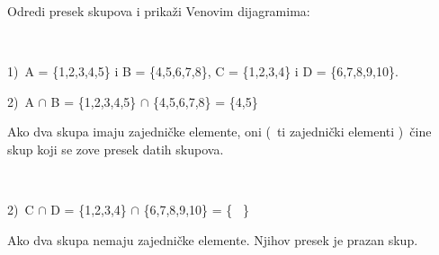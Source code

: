     \begin{zad}

    Odredi presek skupova i prika\v zi Venovim dijagramima: 

    \ 

    

    1)\ A = \{1,2,3,4,5\} i B = \{4,5,6,7,8\}, C = \{1,2,3,4\} i D = \{6,7,8,9,10\}.

    



    2)\ A $\cap$ B = \{1,2,3,4,5\} $\cap$ \{4,5,6,7,8\} = \{4,5\}



    

    \begin{figure}[h] 

        \center


        \caption{}

    \end{figure}



    Ako dva skupa imaju zajedni\v cke elemente, oni (\ ti zajedni\v cki elementi )\ \v cine skup koji se zove presek datih skupova.

    \

    \newpage

    2)\ C $\cap$ D = \{1,2,3,4\} $\cap$ \{6,7,8,9,10\} = \{ \ \}

    

    \begin{figure}[h] 

        \center


        \caption{}

    \end{figure}

    

    Ako dva skupa nemaju zajedni\v cke elemente. Njihov presek je prazan skup.

\ 

\end{zad}

